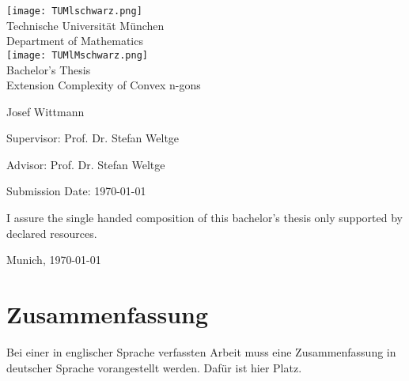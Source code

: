 \begin{titlepage}
\begin{center}
\texttt{[image: TUMlschwarz.png]}\\[3mm]
\sf
{\Large
  Technische Universit\"at M\"unchen\\[5mm]
  Department of Mathematics\\[8mm]
}
\normalsize
\texttt{[image: TUMlMschwarz.png]}\\[15mm]

Bachelor's Thesis\\[15mm]

{\Huge
  Extension Complexity of Convex n-gons
}
\bigskip

\normalsize

Josef Wittmann
\end{center}
\vspace*{75mm}

Supervisor: Prof. Dr. Stefan Weltge
\medskip

Advisor: Prof. Dr. Stefan Weltge
\medskip

Submission Date: \today

\end{titlepage}

\vspace*{150mm}

I assure the single handed composition of this bachelor's thesis only supported by declared resources.
\bigskip

Munich, \today
\newpage

\section*{Zusammenfassung}

Bei einer in englischer Sprache verfassten Arbeit muss eine Zusammenfassung in deutscher Sprache vorangestellt werden.
Daf\"ur ist hier Platz.

\newpage
